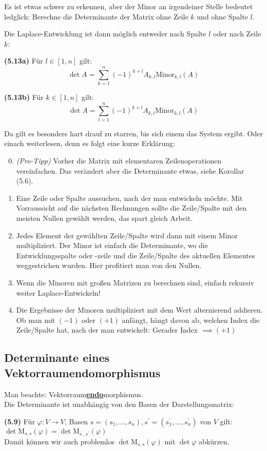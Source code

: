 \documentclass[11pt]{scrartcl}
\newlength{\hangwidth}
\newcommand{\skript}[1]{\settowidth{\hangwidth}{\textbf{(#1)} }\hangpara{\hangwidth}{1}\textbf{(#1)} }
\begin{document}
Es ist etwas schwer zu erkennen, aber der Minor an irgendeiner Stelle bedeutet ledglich: Berechne die Determinante der Matrix ohne Zeile $k$ und ohne Spalte $l$.

Die Laplace-Entwicklung ist dann möglich entweder nach Spalte $l$ oder nach Zeile $k$:

\skript{5.13a} Für $l \in [1,n]$ gilt: \\
$$\det A = \sum_{k=1}^n (-1)^{k+l} A_{k,l} \textrm{Minor}_{k,l}(A)$$

\skript{5.13b} Für $k \in [1,n]$ gilt: \\
$$\det A = \sum_{l=1}^n (-1)^{k+l} A_{k,l} \textrm{Minor}_{k,l}(A)$$

Da gilt es besonders hart drauf zu starren, bis sich einem das System ergibt. Oder einach weiterlesen, denn es folgt eine kurze Erklärung:

\begin{enumerate}
\setcounter{enumi}{-1}
\item \textit{(Pro-Tipp)} Vorher die Matrix mit elementaren Zeilenoperationen vereinfachen. Das verändert aber die Determinante etwas, siehe Korollar (5.6).
\item Eine Zeile oder Spalte aussuchen, nach der man entwickeln möchte. Mit Vorraussicht auf die nächsten Rechnungen sollte die Zeile/Spalte mit den meisten Nullen gewählt werden, das spart gleich Arbeit.
\item Jedes Element der gewählten Zeile/Spalte wird dann mit einem Minor multipliziert. Der Minor ist einfach die Determinante, wo die Entwicklungsspalte oder -zeile und die Zeile/Spalte des aktuellen Elementes weggestrichen wurden. Hier profitiert man von den Nullen.
\item Wenn die Minoren mit großen Matrizen zu berechnen sind, einfach rekursiv weiter Laplace-Entwickeln!
\item Die Ergebnisse der Minoren multipliziert mit dem Wert alternierend addieren. Ob man mit $(-1)$ oder $(+1)$ anfängt, hängt davon ab, welchen Index die Zeile/Spalte hat, nach der man entwickelt: Gerader Index $\implies (+1)$
\end{enumerate}

\subsection{Determinante eines Vektorraumendomorphismus}

Man beachte: Vektorraum\textbf{\underline{endo}}morphismus. \\

Die Determinante ist unabhängig von den Basen der Darstellungsmatrix:

\skript{5.9}Für  $\varphi : V \to V$, Basen $s = (s_1, \ldots, s_n), s^\prime = (s^\prime_1, \ldots, s^\prime_n)$ von $V$ gilt: \\
$\det \textrm{M}_{s,s}(\varphi) = \det \textrm{M}_{s^\prime, s^\prime}(\varphi)$ \\

Damit können wir auch problemlos $\det \textrm{M}_{s,s}(\varphi)$ mit $\det \varphi$ abkürzen.
\end{document}
